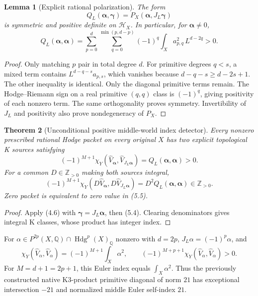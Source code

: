 \documentclass[11pt]{article}
\newcommand{\Q}{\mathbb Q}
\newcommand{\Z}{\mathbb Z}
\newcommand{\Hdg}{\operatorname{Hdg}}
\newtheorem{theorem}{Theorem}[section]
\newtheorem{lemma}[theorem]{Lemma}
\begin{document}
\begin{lemma}[Explicit rational polarization]
The form
\[
 Q_L(\boldsymbol\alpha,\boldsymbol\gamma)
       =P_X(\boldsymbol\alpha,J_L\boldsymbol\gamma)
 \tag{5.3}
\]
is symmetric and positive definite on $\mathcal H_X$. In particular,
for $\boldsymbol\alpha\ne0$,
\[
 \boxed{Q_L(\boldsymbol\alpha,\boldsymbol\alpha)
    =\sum_{p=0}^{d}
       \sum_{q=0}^{\min(p,d-p)}
       (-1)^q\int_X a_{p,q}^2\,L^{d-2q}>0.}
 \tag{5.4}
\]
\end{lemma}
\begin{proof}
Only matching $p$ pair in total degree $d$.
For primitive degrees $q<s$, a mixed term contains
$L^{d-q-s}a_{p,s}$, which vanishes because
$d-q-s\ge d-2s+1$. The other inequality is identical.
Only the diagonal primitive terms remain.
The Hodge--Riemann sign on a real primitive $(q,q)$ class is
$(-1)^q$, giving positivity of each nonzero term.
The same orthogonality proves symmetry. Invertibility of $J_L$
and positivity also prove nondegeneracy of $P_X$.
\end{proof}

\begin{theorem}[Unconditional positive middle-world index detector]
Every nonzero prescribed rational Hodge packet on every original
$X$ has two explicit topological K sources satisfying
\[
 \boxed{(-1)^{M+1}
   \chi_Y(\widehat V_{\boldsymbol\alpha},
          \widehat V_{J_L\boldsymbol\alpha})
     =Q_L(\boldsymbol\alpha,\boldsymbol\alpha)>0.}
 \tag{5.5}
\]
For a common $D\in\Z_{>0}$ making both sources integral,
\[
 \boxed{(-1)^{M+1}
 \chi_Y(D\widehat V_{\boldsymbol\alpha},
        D\widehat V_{J_L\boldsymbol\alpha})
       =D^2Q_L(\boldsymbol\alpha,\boldsymbol\alpha)
       \in\Z_{>0}.}
 \tag{5.6}
\]
Zero packet is equivalent to zero value in (5.5).
\end{theorem}
\begin{proof}
Apply (4.6) with $\boldsymbol\gamma=J_L\boldsymbol\alpha$,
then (5.4). Clearing denominators gives integral K classes,
whose product has integer index.
\end{proof}

For $\alpha\in P^{2p}(X,\Q)\cap\Hdg^p(X)_{\Q}$ nonzero with $d=2p$,
$J_L\alpha=(-1)^p\alpha$, and
\[
 \boxed{\chi_Y(\widehat V_\alpha,\widehat V_\alpha)
          =(-1)^{M+1}\int_X\alpha^2,\qquad
 (-1)^{M+p+1}
   \chi_Y(\widehat V_\alpha,\widehat V_\alpha)>0.}
 \tag{5.7}
\]
For $M=d+1=2p+1$, this Euler index equals $\int_X\alpha^2$.
Thus the previously constructed native K3-product primitive diagonal
of norm $21$ has exceptional intersection $-21$ and normalized
middle Euler self-index $21$.
\end{document}

